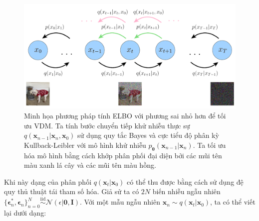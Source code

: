 \documentclass[14pt, a4paper]{article}
\numberwithin{equation}{section}
\numberwithin{figure}{section}
\numberwithin{dl}{section}
\numberwithin{md}{section}
\numberwithin{bd}{section}
\numberwithin{dn}{section}
\numberwithin{hq}{section}
\begin{document}
    \begin{figure}[h!]
        \centering
        \includegraphics[width=\textwidth]{VDM-Optimize-Backprop.png}
        \caption{Minh họa phương pháp tính ELBO với phương sai nhỏ hơn để tối ưu VDM.
        Ta tính bước chuyển tiếp khử nhiễu thực sự $q(\boldsymbol{x}_{n-1} \vert \boldsymbol{x}_n, \boldsymbol{x}_0)$ sử dụng quy tắc Bayes và cực tiểu độ phân kỳ Kullback-Leibler với mô hình khử nhiễu $p_{\boldsymbol{\theta}} (\boldsymbol{x}_{n-1} \vert \boldsymbol{x}_n)$.
        Ta tối ưu hóa mô hình bằng cách khớp phân phối đại diện bởi các mũi tên màu xanh lá cây và các mũi tên màu hồng.}
        \label{fig:VDM-Optimize-Backprop}
    \end{figure}

    Khi này dạng của phân phối $q(\boldsymbol{x}_t \vert \boldsymbol{x}_0)$ có thể thu được bằng cách sử dụng đệ quy thủ thuật tái tham số hóa.
    Giả sử ta có $2N$ biến nhiễu ngẫu nhiên $\lbrace \boldsymbol{\epsilon}_n^{\ast}, \boldsymbol{\epsilon}_n \rbrace_{n=0}^N \stackrel{\text{iid}}{\sim} \mathcal{N}(\epsilon \vert \boldsymbol{0}, \boldsymbol{I})$.
    Với một mẫu ngẫu nhiên $\boldsymbol{x}_n \sim q(\boldsymbol{x}_t \vert \boldsymbol{x}_0)$, ta có thể viết lại dưới dạng:
\end{document}
